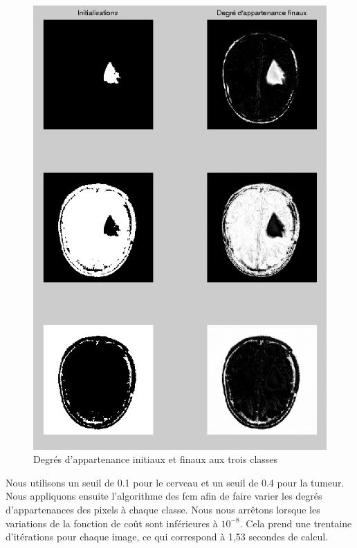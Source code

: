 		\begin{figure}[H]
			\centering
			\includegraphics[height=\textheight]{images/2-fcm_bin.png}
			\caption{Degrés d'appartenance initiaux et finaux aux trois classes}
			\label{fig:fcm_avec_binarisation}
		\end{figure}

		Nous utilisons un seuil de 0.1 pour le cerveau et un seuil de 0.4 pour la tumeur.\\

		Nous appliquons ensuite l'algorithme des fcm afin de faire varier les degrés d'appartenances des pixels à chaque classe. Nous nous arrêtons lorsque les variations de la fonction de coût sont inférieures à $10^{-8}$. Cela prend une trentaine d'itérations pour chaque image, ce qui correspond à 1,53 secondes de calcul.

